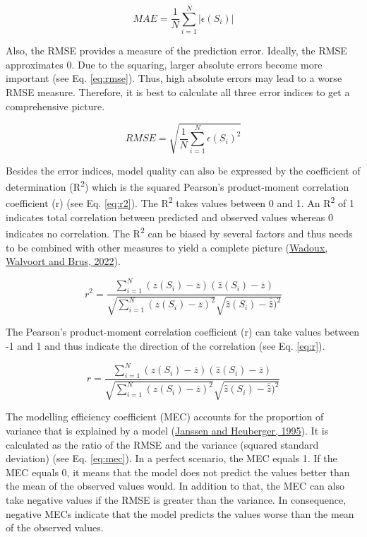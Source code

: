 \documentclass[
  10pt,
  b5paper,
  oneside]{book}
\begin{document}
\begin{equation} 
  MAE = \frac{1}{N}\sum_{i=1}^{N}|\epsilon(S_{i})|
  \label{eq:mae}
\end{equation}

Also, the RMSE provides a measure of the prediction error. Ideally, the RMSE approximates 0. Due to the squaring, larger absolute errors become more important (see Eq. \eqref{eq:rmse}). Thus, high absolute errors may lead to a worse RMSE measure. Therefore, it is best to calculate all three error indices to get a comprehensive picture.

\begin{equation} 
  RMSE = \sqrt{\frac{1}{N}\sum_{i=1}^{N}\epsilon(S_{i})^{2}}
  \label{eq:rmse}
\end{equation}

Besides the error indices, model quality can also be expressed by the coefficient of determination (R\textsuperscript{2}) which is the squared Pearson's product-moment correlation coefficient (r) (see Eq. \eqref{eq:r2}). The R\textsuperscript{2} takes values between 0 and 1. An R\textsuperscript{2} of 1 indicates total correlation between predicted and observed values whereas 0 indicates no correlation. The R\textsuperscript{2} can be biased by several factors and thus needs to be combined with other measures to yield a complete picture (\protect\hyperlink{ref-Wadoux2022}{Wadoux, Walvoort and Brus, 2022}).

\begin{equation} 
  r^2 = \frac{\sum_{i=1}^{N}(z(S_{i})-\overline{z})(\hat{z}(S_{i})-\overline{z})}{\sqrt{\sum_{i=1}^{N}(z(S_{i})-\overline{z})^2}\sqrt{\hat{z}(S_{i})-\overline{\hat{z}})^2}}
  \label{eq:r2}
\end{equation}

The Pearson's product-moment correlation coefficient (r) can take values between -1 and 1 and thus indicate the direction of the correlation (see Eq. \eqref{eq:r}).

\begin{equation} 
  r = \frac{\sum_{i=1}^{N}(z(S_{i})-\overline{z})(\hat{z}(S_{i})-\overline{z})}{\sqrt{\sum_{i=1}^{N}(z(S_{i})-\overline{z})^2}\sqrt{\hat{z}(S_{i})-\overline{\hat{z}})^2}}
  \label{eq:r}
\end{equation}

The modelling efficiency coefficient (MEC) accounts for the proportion of variance that is explained by a model (\protect\hyperlink{ref-Janssen1995}{Janssen and Heuberger, 1995}). It is calculated as the ratio of the RMSE and the variance (squared standard deviation) (see Eq. \eqref{eq:mec}). In a perfect scenario, the MEC equals 1. If the MEC equals 0, it means that the model does not predict the values better than the mean of the observed values would. In addition to that, the MEC can also take negative values if the RMSE is greater than the variance. In consequence, negative MECs indicate that the model predicts the values worse than the mean of the observed values.
\end{document}

